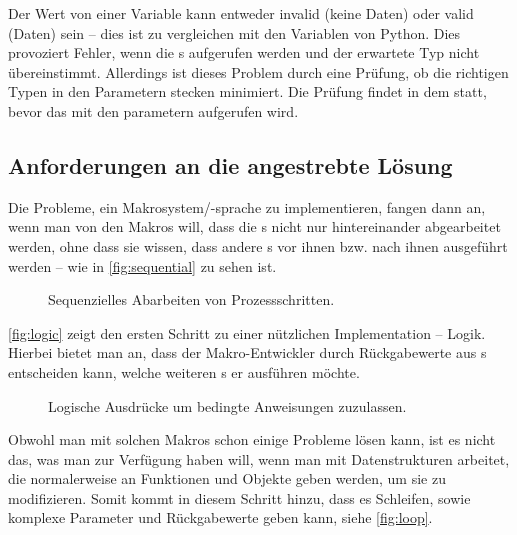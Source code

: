       Der Wert von einer  Variable kann entweder invalid (keine Daten) oder valid (Daten) sein -- dies ist zu vergleichen mit den Variablen von Python. Dies provoziert Fehler, wenn die s aufgerufen werden und der erwartete Typ nicht übereinstimmt. Allerdings ist dieses Problem durch eine Prüfung, ob die richtigen Typen in den  Parametern stecken minimiert. Die Prüfung findet in dem  statt, bevor das  mit den parametern aufgerufen wird.

  \subsection{Anforderungen an die angestrebte Lösung}
  \label{ssec:Anforderungen an die angestrebte Lösung}
    Die Probleme, ein Makrosystem/-sprache zu implementieren, fangen dann an, wenn man von den Makros will, dass die s nicht nur hintereinander abgearbeitet werden, ohne dass sie wissen, dass andere s vor ihnen bzw. nach ihnen ausgeführt werden -- wie in \autoref{fig:sequential} zu sehen ist.

    \begin{figure}[H]
      \centering
      \caption{Sequenzielles Abarbeiten von Prozessschritten.}
      \label{fig:sequential}
    \end{figure}

    \autoref{fig:logic} zeigt den ersten Schritt zu einer nützlichen Implementation -- Logik. Hierbei bietet man an, dass der Makro-Entwickler durch Rückgabewerte aus s entscheiden kann, welche weiteren s er ausführen möchte.

    \begin{figure}[H]
      \centering
      \caption{Logische Ausdrücke um bedingte Anweisungen zuzulassen.}
      \label{fig:logic}
    \end{figure}

    Obwohl man mit solchen Makros schon einige Probleme lösen kann, ist es nicht das, was man zur Verfügung haben will, wenn man mit Datenstrukturen arbeitet, die normalerweise an Funktionen und Objekte geben werden, um sie zu modifizieren. Somit kommt in diesem Schritt hinzu, dass es Schleifen, sowie komplexe Parameter und Rückgabewerte geben kann, siehe \autoref{fig:loop}.

